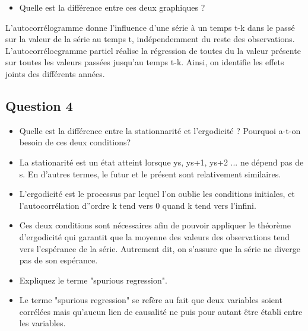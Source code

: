 \documentclass[11pt]{article}
\providecommand{\tightlist}{%
      \setlength{\itemsep}{0pt}\setlength{\parskip}{0pt}}
\begin{document}
    \begin{itemize}
\tightlist
\item
  Quelle est la différence entre ces deux graphiques ?
\end{itemize}

    L'autocorrélogramme donne l'influence d'une série à un temps t-k dans le
passé sur la valeur de la série au temps t, indépendemment du reste des
observations. L'autocorrélocgramme partiel réalise la régression de
toutes du la valeur présente sur toutes les valeurs passées jusqu'au
temps t-k. Ainsi, on identifie les effets joints des différents années.

    \subsection{Question 4}\label{question-4}

\begin{itemize}
\tightlist
\item
  Quelle est la différence entre la stationnarité et l'ergodicité ?
  Pourquoi a-t-on besoin de ces deux conditions?
\end{itemize}

    \begin{itemize}
\tightlist
\item
  La stationarité est un état atteint lorsque ys, ys+1, ys+2 ... ne
  dépend pas de s. En d'autres termes, le futur et le présent sont
  relativement similaires.
\item
  L'ergodicité est le processus par lequel l'on oublie les conditions
  initiales, et l'autocorrélation d''ordre k tend vers 0 quand k tend
  vers l'infini.
\item
  Ces deux conditions sont nécessaires afin de pouvoir appliquer le
  théorème d'ergodicité qui garantit que la moyenne des valeurs des
  observations tend vers l'espérance de la série. Autrement dit, on
  s'assure que la série ne diverge pas de son espérance.
\end{itemize}

    \begin{itemize}
\tightlist
\item
  Expliquez le terme "spurious regression".
\end{itemize}

    \begin{itemize}
\tightlist
\item
  Le terme "spurious regression" se refère au fait que deux variables
  soient corrélées mais qu'aucun lien de causalité ne puis pour autant
  être établi entre les variables.
\end{itemize}
\end{document}
